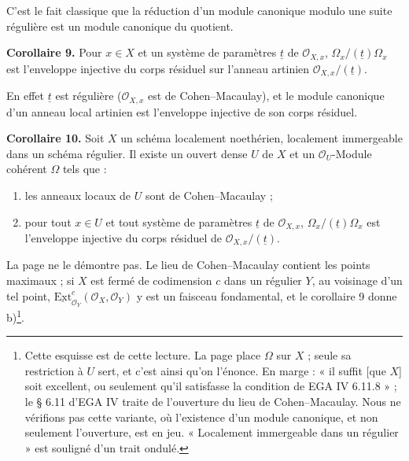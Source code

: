 \documentclass[11pt,a4paper]{article}
\begin{document}
C'est le fait classique que la réduction d'un module canonique modulo une
suite régulière est un module canonique du quotient.

\textbf{Corollaire 9.} Pour $x \in X$ et un système de paramètres
$\underline{t}$ de $\mathcal{O}_{X,x}$, $\Omega_x/(\underline{t})\Omega_x$ est
l'enveloppe injective du corps résiduel sur l'anneau artinien
$\mathcal{O}_{X,x}/(\underline{t})$.

En effet $\underline{t}$ est régulière ($\mathcal{O}_{X,x}$ est de
Cohen--Macaulay), et le module canonique d'un anneau local artinien est
l'enveloppe injective de son corps résiduel.

\textbf{Corollaire 10.} Soit $X$ un schéma localement noethérien, localement
immergeable dans un schéma régulier. Il existe un ouvert dense $U$ de $X$ et un
$\mathcal{O}_U$-Module cohérent $\Omega$ tels que :
\begin{enumerate}
\item[a)] les anneaux locaux de $U$ sont de Cohen--Macaulay ;
\item[b)] pour tout $x \in U$ et tout système de paramètres $\underline{t}$ de
$\mathcal{O}_{X,x}$, $\Omega_x/(\underline{t})\Omega_x$ est l'enveloppe
injective du corps résiduel de $\mathcal{O}_{X,x}/(\underline{t})$.
\end{enumerate}
La page ne le démontre pas. Le lieu de Cohen--Macaulay contient les points
maximaux ; si $X$ est fermé de codimension $c$ dans un régulier $Y$, au
voisinage d'un tel point, $\underline{\mathrm{Ext}}^c_{\mathcal{O}_Y}
(\mathcal{O}_X, \mathcal{O}_Y)$ y est un faisceau fondamental, et le
corollaire 9 donne b)\footnote{Cette esquisse est de cette lecture. La page
place $\Omega$ sur $X$ ; seule sa restriction à $U$ sert, et c'est ainsi qu'on
l'énonce. En marge : « il suffit [que $X$] soit excellent, ou seulement qu'il
satisfasse la condition de EGA IV 6.11.8 » ; le § 6.11 d'EGA IV traite de
l'ouverture du lieu de Cohen--Macaulay. Nous ne vérifions pas cette variante,
où l'existence d'un module canonique, et non seulement l'ouverture, est en
jeu. « Localement immergeable dans un régulier » est souligné d'un trait
ondulé.}.
\end{document}
